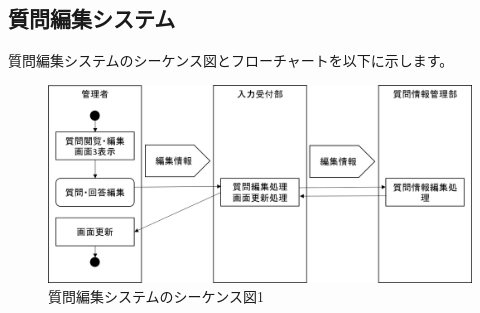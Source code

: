 \newpage
\subsection{質問編集システム}
質問編集システムのシーケンス図とフローチャートを以下に示します。

\begin{figure}[htbp]
  \begin{center}
    \includegraphics[width=1\linewidth,clip]{./img/q_edit/main.png}
    \caption{質問編集システムのシーケンス図1}\label{fig:qeditseaquence}
  \end{center}
\end{figure}


